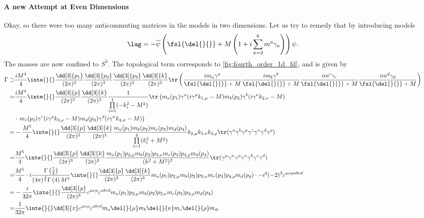 \paragraph{A new Attempt at Even Dimensions}
Okay, so there were too many anticommuting matrices in the models in two dimensions. Let us try to remedy that by introducing models
\begin{align*}
	\lag = -\overline{\psi}\left(\fsl{\del{}{}} + M\left(1 + i\sum\limits_{a = 3}^{6}m^{a}\gamma_{a}\right)\right)\psi.
\end{align*}
The masses are now confined to $S^{3}$. The topological term corresponds to \ref{fig:fourth_order_1d_fd}, and is given by
\begin{align*}
	\Gamma \supset& \frac{iM^{4}}{4}\inte{}{}\frac{\dd[3]{p_{1}}}{(2\pi)^{3}}\frac{\dd[3]{p_{2}}}{(2\pi)^{3}}\frac{\dd[3]{p_{3}}}{(2\pi)^{3}}\frac{\dd[3]{k}}{(2\pi)^{3}}\tr\left(\frac{im_{a}\gamma^{a}}{\fsl{\del{}{}} + M}\frac{im_{b}\gamma^{b}}{\fsl{\del{}{}} + M}\frac{im^{c}\gamma_{c}}{\fsl{\del{}{}} + M}\frac{im^{d}\gamma_{d}}{\fsl{\del{}{}} + M}\right) \\
	=& \frac{iM^{4}}{4}\inte{}{}\frac{\dd[3]{p}}{(2\pi)^{3}}\frac{\dd[3]{k}}{(2\pi)^{3}}\frac{1}{\prod\limits_{i = 1}^{4}(-k_{i}^{2} - M^{2})}\tr\left(m_{a}(p_{1})\gamma^{a}(i\gamma^{\mu}k_{1, \mu} - M)m_{b}(p_{2})\gamma^{b}(i\gamma^{\nu}k_{2, \nu} - M) \right. \\
	 &\cdot \left. m_{c}(p_{3})\gamma^{c}(i\gamma^{\rho}k_{3, \rho} - M)m_{d}(p_{4})\gamma^{d}(i\gamma^{\sigma}k_{4, \sigma} - M)\right) \\
	=& -\frac{M^{5}}{4}\inte{}{}\frac{\dd[3]{p}}{(2\pi)^{3}}\frac{\dd[3]{k}}{(2\pi)^{3}}\frac{m_{a}(p_{1})m_{b}(p_{2})m_{c}(p_{3})m_{d}(p_{4})}{\prod\limits_{i = 1}^{4}(k_{i}^{2} + M^{2})}k_{2, \mu}k_{3, \nu}k_{4, \rho}\tr(\gamma^{a}\gamma^{b}\gamma^{\mu}\gamma^{c}\gamma^{\nu}\gamma^{d}\gamma^{\rho}) \\
	=& \frac{M^{5}}{4}\inte{}{}\frac{\dd[3]{p}}{(2\pi)^{3}}\frac{\dd[3]{k}}{(2\pi)^{3}}\frac{m_{a}(p_{1})p_{2, \mu}m_{b}(p_{2})p_{3, \nu}m_{c}(p_{3})p_{4, \rho}m_{d}(p_{4})}{(k^{2} + M^{2})^{2}}\tr(\gamma^{\mu}\gamma^{\nu}\gamma^{\rho}\gamma^{a}\gamma^{b}\gamma^{c}\gamma^{d}) \\
	=& \frac{M^{5}}{4}\cdot i\frac{\Gamma\left(\frac{5}{2}\right)}{(4\pi)^{\frac{3}{2}}\Gamma\left(4\right)M^{5}}\inte{}{}\frac{\dd[3]{p}}{(2\pi)^{3}}\frac{\dd[3]{k}}{(2\pi)^{3}}m_{a}(p_{1})p_{2, \mu}m_{b}(p_{2})p_{3, \nu}m_{c}(p_{3})p_{4, \rho}m_{d}(p_{4})\cdot -i^{2}(-2)^{3}\varepsilon^{\mu\nu\rho abcd} \\
	=& -\frac{i}{32\pi}\inte{}{}\frac{\dd[3]{p}}{(2\pi)^{3}}\varepsilon^{\mu\nu\rho}\varepsilon^{abcd}m_{a}(p_{1})p_{2, \mu}m_{b}(p_{2})p_{3, \nu}m_{c}(p_{3})p_{4, \rho}m_{d}(p_{4}) \\
	=& \frac{1}{32\pi}\inte{}{}\dd[3]{x}\varepsilon^{\mu\nu\rho}\varepsilon^{abcd}m_{a}\del{}{\mu}m_{b}\del{}{\nu}m_{c}\del{}{\rho}m_{d}.
\end{align*}

